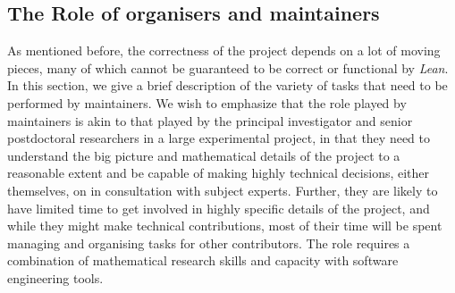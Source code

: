 \documentclass[12pt]{amsart}
\theoremstyle{definition}
\begin{document}
\subsection{The Role of organisers and maintainers}
As mentioned before, the correctness of the project depends on a lot of moving pieces, many of which cannot be guaranteed to be correct or functional by \emph{Lean}. In this section, we give a brief description of the variety of tasks that need to be performed by maintainers. We wish to emphasize that the role played by maintainers is akin to that played by the principal investigator and senior postdoctoral researchers in a large experimental project, in that they need to understand the big picture and mathematical details of the project to a reasonable extent and be capable of making highly technical decisions, either themselves, on in consultation with subject experts. Further, they are likely to have limited time to get involved in highly specific details of the project, and while they might make technical contributions, most of their time will be spent managing and organising tasks for other contributors. The role requires a  combination of mathematical research skills and capacity with software engineering tools.
\end{document}
